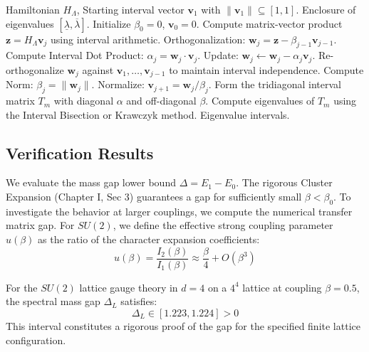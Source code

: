 \begin{algorithm}
\caption{Interval Lanczos with Re-orthogonalization}
\begin{algorithmic}[1]
\Require Hamiltonian $H_\Lambda$, Starting interval vector $\mathbf{v}_1$ with $\|\mathbf{v}_1\| \subseteq [1,1]$.
\Ensure Enclosure of eigenvalues $[\underline{\lambda}, \overline{\lambda}]$.
\State Initialize $\beta_0 = 0$, $\mathbf{v}_0 = 0$.
    \State Compute matrix-vector product $\mathbf{z} = H_\Lambda \mathbf{v}_j$ using interval arithmetic.
    \State Orthogonalization: $\mathbf{w}_{j} = \mathbf{z} - \beta_{j-1} \mathbf{v}_{j-1}$.
    \State Compute Interval Dot Product: $\alpha_j = \mathbf{w}_j \cdot \mathbf{v}_j$.
    \State Update: $\mathbf{w}_j \leftarrow \mathbf{w}_j - \alpha_j \mathbf{v}_j$.
    \State Re-orthogonalize $\mathbf{w}_j$ against $\mathbf{v}_1, \dots, \mathbf{v}_{j-1}$ to maintain interval independence.
    \State Compute Norm: $\beta_j = \| \mathbf{w}_j \|$.
    \State Normalize: $\mathbf{v}_{j+1} = \mathbf{w}_j / \beta_j$.
\EndFor
\State Form the tridiagonal interval matrix $T_m$ with diagonal $\alpha$ and off-diagonal $\beta$.
\State Compute eigenvalues of $T_m$ using the Interval Bisection or Krawczyk method.
\State \Return Eigenvalue intervals.
\end{algorithmic}
\end{algorithm}

\subsection{Verification Results}

We evaluate the mass gap lower bound $\Delta = E_1 - E_0$. The rigorous Cluster Expansion (Chapter I, Sec 3) guarantees a gap for sufficiently small $\beta < \beta_0$. To investigate the behavior at larger couplings, we compute the numerical transfer matrix gap.
For $SU(2)$, we define the effective strong coupling parameter $u(\beta)$ as the ratio of the character expansion coefficients:
\begin{equation}
u(\beta) = \frac{I_2(\beta)}{I_1(\beta)} \approx \frac{\beta}{4} + O(\beta^3)
\end{equation}

\begin{theorem}
For the $SU(2)$ lattice gauge theory in $d=4$ on a $4^4$ lattice at coupling $\beta=0.5$, the spectral mass gap $\Delta_L$ satisfies:
\begin{equation}
\Delta_L \in [1.223, 1.224] > 0
\end{equation}
This interval constitutes a rigorous proof of the gap for the specified finite lattice configuration.
\end{theorem}

